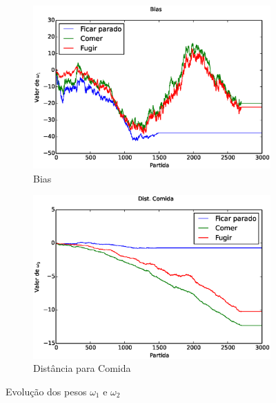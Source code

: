 \begin{figure}[h]
	\centering
	\begin{subfigure}[t]{.5\textwidth}
		\centering
		\includegraphics[width=\linewidth]{images/3_behaviors_small_map/weights____pol__Bias}
		\caption{Bias}
		\label{img:3ComportamentosMapaPequeno:PesoBias}
	\end{subfigure}%
	\begin{subfigure}[t]{.5\textwidth}
		\centering
		\includegraphics[width=\linewidth]{images/3_behaviors_small_map/weights____pol__DistComida}
		\caption{Distância para Comida}
		\label{img:3ComportamentosMapaPequeno:PesoDistComida}
	\end{subfigure}
	\caption{Evolução dos pesos $ \omega_1 $ e $ \omega_2 $}
	\label{img:3ComportamentosMapaPequeno:PesoBiasAndDistComida}
\end{figure}

